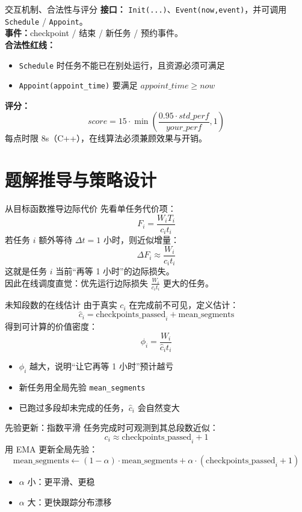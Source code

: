 \documentclass[10pt,aspectratio=169]{beamer}
\begin{document}
\begin{frame}{交互机制、合法性与评分}
\textbf{接口：}
\texttt{Init(...)}、\texttt{Event(now,event)}，并可调用 \texttt{Schedule} / \texttt{Appoint}。\\[2pt]
\textbf{事件：}checkpoint / 结束 / 新任务 / 预约事件。\\[2pt]
\textbf{合法性红线：}
\begin{itemize}
  \item \texttt{Schedule} 时任务不能已在别处运行，且资源必须可满足
  \item \texttt{Appoint(appoint\_time)} 要满足 $appoint\_time\ge now$
\end{itemize}
\textbf{评分：}
\[
score=15\cdot\min\!\left(\frac{0.95\cdot std\_perf}{your\_perf},1\right)
\]
每点时限 8s（C++），在线算法必须兼顾效果与开销。
\end{frame}

\section{题解推导与策略设计}

\begin{frame}{从目标函数推导边际代价}
先看单任务代价项：
\[
F_i=\frac{W_i T_i}{c_i t_i}
\]
若任务 $i$ 额外等待 $\Delta t=1$ 小时，则近似增量：
\[
\Delta F_i \approx \frac{W_i}{c_i t_i}
\]
这就是任务 $i$ 当前“再等 1 小时”的边际损失。\\[4pt]
因此在线调度直觉：优先运行边际损失 $\frac{W_i}{c_i t_i}$ 更大的任务。
\end{frame}

\begin{frame}{未知段数的在线估计}
由于真实 $c_i$ 在完成前不可见，定义估计：
\[
\hat c_i=\text{checkpoints\_passed}_i+\text{mean\_segments}
\]
得到可计算的价值密度：
\[
\phi_i=\frac{W_i}{\hat c_i t_i}
\]
\begin{itemize}
  \item $\phi_i$ 越大，说明“让它再等 1 小时”预计越亏
  \item 新任务用全局先验 \texttt{mean\_segments}
  \item 已跑过多段却未完成的任务，$\hat c_i$ 会自然变大
\end{itemize}
\end{frame}

\begin{frame}{先验更新：指数平滑}
任务完成时可观测到其总段数近似：
\[
c_i\approx \text{checkpoints\_passed}_i+1
\]
用 EMA 更新全局先验：
\[
\text{mean\_segments}\leftarrow(1-\alpha)\cdot\text{mean\_segments}
+\alpha\cdot(\text{checkpoints\_passed}_i+1)
\]
\begin{itemize}
  \item $\alpha$ 小：更平滑、更稳
  \item $\alpha$ 大：更快跟踪分布漂移
\end{itemize}
\end{frame}
\end{document}
